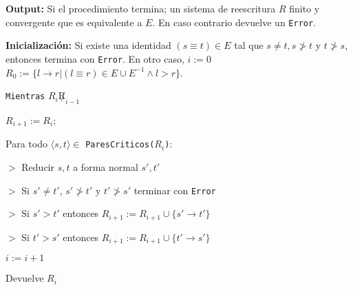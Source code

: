 \textbf{Output:} Si el procedimiento termina; un sistema de
reescritura $R$ finito y convergente que es equivalente a $E$. En caso
contrario devuelve un \texttt{Error}.

\textbf{Inicialización:}
Si existe una identidad $(s \equiv t) \in E$ tal que
$s \not = t, s \not > t$ y $t \not > s$, entonces termina con
\texttt{Error}.
En otro caso,
$i := 0$
$R_0 := \{l \rightarrow r | (l \equiv r) \in E \cup E^{-1} \wedge l > r \}$.

\texttt{Mientras} $R_i \not R_{i-1}$

$R_{i+1} := R_i$;

Para todo $\langle s, t \rangle \in$ \texttt{ParesCriticos($R_i$)}:

$>$ Reducir $s,t$ a forma normal $s', t'$

$>$ Si $s' \not = t'$, $s' \not > t'$ y $t' \not > s'$ terminar con \texttt{Error}

$>$ Si $s' > t'$ entonces $R_{i+1} := R_{i+1} \cup \{s' \rightarrow t'\}$

$>$ Si $t' > s'$ entonces $R_{i+1} := R_{i+1} \cup \{t' \rightarrow s'\}$

$i := i+1$

Devuelve $R_i$

\hrulefill

 



\clearpage
\addappheadtotoc
\appendix


